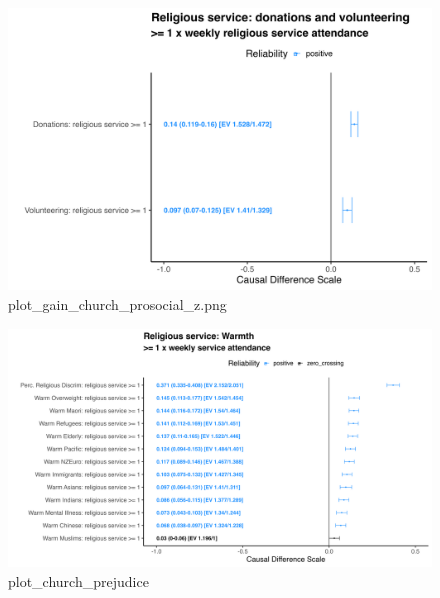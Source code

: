 \documentclass[
  ignorenonframetext,
  aspectratio=169,
]{beamer}
\begin{document}
\begin{frame}
\begin{figure}[H]

{\centering \includegraphics{plot_gain_church_prosocial_z.png}

}

\caption{plot\_gain\_church\_prosocial\_z.png}

\end{figure}%
\end{frame}

\begin{frame}
\begin{figure}[H]

{\centering \includegraphics{plot_prejudice_church.png}

}

\caption{plot\_church\_prejudice}

\end{figure}%
\end{frame}
\end{document}
